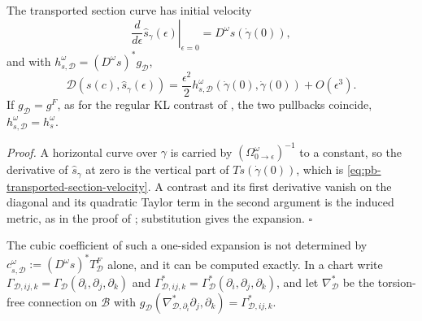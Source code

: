 The transported section curve has initial velocity
\begin{equation}
\left.\frac{d}{d\epsilon}\widehat s_\gamma(\epsilon)\right|_{\epsilon=0}
=D^\omega s(\dot\gamma(0)),
\label{eq:pb-transported-section-velocity}
\end{equation}
and with \(h_{s,\mathscr D}^\omega=(D^\omega s)^*g_{\mathscr D}\),
\begin{equation}
\mathscr D(s(c),\widehat s_\gamma(\epsilon))
=\frac{\epsilon^2}{2}h_{s,\mathscr D}^\omega
(\dot\gamma(0),\dot\gamma(0))
+O(\epsilon^3).
\label{eq:pb-transported-divergence-expansion}
\end{equation}
If \(g_{\mathscr D}=g^F\), as for the regular KL contrast of
, the two pullbacks coincide,
\(h_{s,\mathscr D}^\omega=h_s^\omega\). 

\noindent\emph{Proof.}
A horizontal curve over \(\gamma\) is carried by \((\Omega^\omega_{0\to\epsilon})^{-1}\) to a constant,
so the derivative of \(\widehat s_\gamma\) at zero is the vertical part of \(Ts(\dot\gamma(0))\),
which is \eqref{eq:pb-transported-section-velocity}. A contrast and its first derivative vanish on the
diagonal and its quadratic Taylor term in the second argument is the induced metric, as in the proof
of ; substitution gives the expansion. \hfill$\square$

The cubic coefficient of such a one-sided expansion is not determined by
\(c^\omega_{s,\mathscr D}:=(D^\omega s)^*T^F_{\mathscr D}\) alone, and it can be computed exactly. In a
chart write \(\Gamma_{\mathscr D,ij,k}=\Gamma_{\mathscr D}(\partial_i,\partial_j,\partial_k)\) and
\(\Gamma^*_{\mathscr D,ij,k}=\Gamma^*_{\mathscr D}(\partial_i,\partial_j,\partial_k)\), and let
\(\nabla^*_{\mathscr D}\) be the torsion-free connection on \(\mathcal B\) with
\(g_{\mathscr D}(\nabla^*_{\mathscr D,\partial_i}\partial_j,\partial_k)=\Gamma^*_{\mathscr D,ij,k}\).

